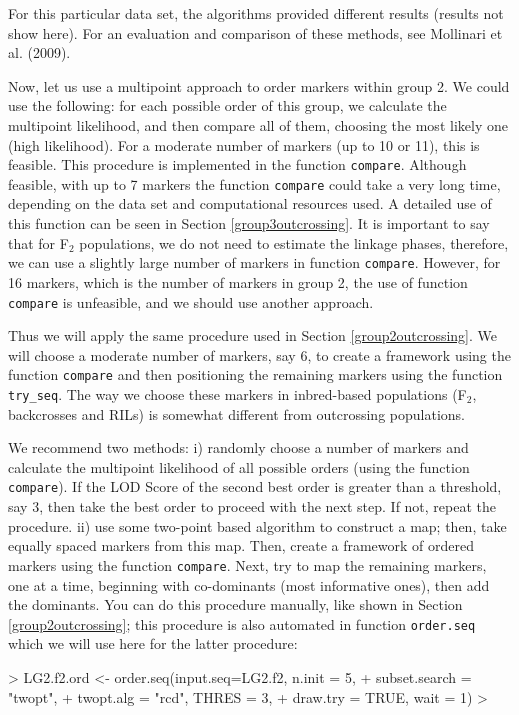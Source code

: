 \documentclass[letterpaper,12pt,oneside]{article}
\begin{document}
\begin{enumerate}
For this particular data set, the algorithms provided different results (results not show here). For an evaluation and comparison of these methods, see Mollinari et al. (2009).

Now, let us use a multipoint approach to order markers within group 2. We could use the following: for each possible order of this group, we calculate the multipoint likelihood, and then compare all of them, choosing the most likely one (high likelihood). For a moderate number of markers (up to 10 or 11), this is feasible. This procedure is implemented in the function {\tt compare}. Although feasible, with up to 7 markers the function {\tt compare} could take a very long time, depending on the data set and computational resources used.  A detailed use of this function can be seen in Section \ref{group3outcrossing}. It is important to say that for F$_2$ populations, we do not need to estimate the linkage phases, therefore, we can use a slightly large number of markers in function {\tt compare}. However, for 16 markers, which is the number of markers in group 2, the use of function {\tt compare} is unfeasible, and we should use another approach.

Thus we will apply the same procedure used in Section \ref{group2outcrossing}. We will choose a moderate number of markers, say 6, to create a framework using the function {\tt compare} and then positioning the remaining markers using the function {\tt try_seq}. The way we choose these markers in inbred-based populations (F$_2$, backcrosses and RILs) is somewhat different from outcrossing populations. 

We recommend two methods: i) randomly choose a number of markers and calculate the multipoint likelihood of all possible orders (using the function {\tt compare}). If the LOD Score of the second best order is greater than a threshold, say 3, then take the best order to proceed with the next step. If not, repeat the procedure. ii) use some two-point based algorithm to construct a map; then, take equally spaced markers from this map. Then, create a framework of ordered markers using the function {\tt compare}. Next, try to map the remaining markers, one at a time, beginning with co-dominants (most informative ones), then add the dominants.  You can do this procedure manually, like shown in Section \ref{group2outcrossing}; this procedure is also automated in function {\tt order.seq} which we will use here for the latter procedure:

\begin{Schunk}
\begin{Sinput}
> LG2.f2.ord <- order.seq(input.seq=LG2.f2, n.init = 5, 
+                         subset.search = "twopt", 
+                         twopt.alg = "rcd", THRES = 3, 
+                         draw.try = TRUE, wait = 1)
>                         
\end{Sinput}
\end{Schunk}


\end{enumerate}
\end{document}
